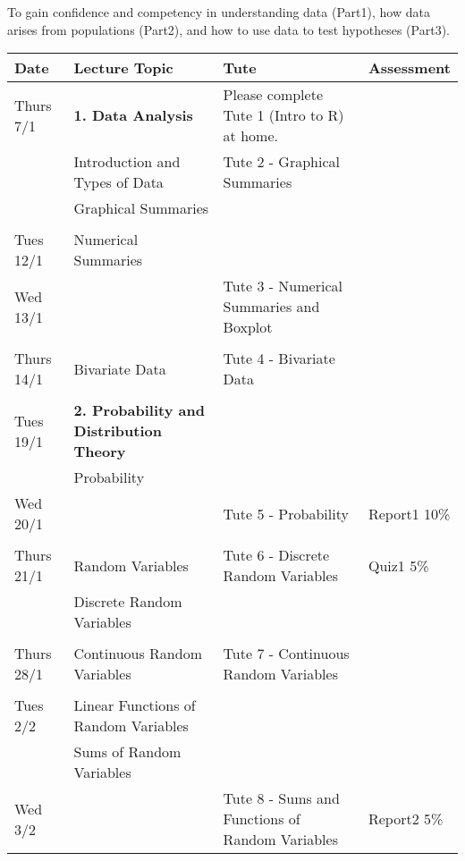 \documentclass[bigtut]{quiz}
\begin{document}

\begin{tutorial}

\vspace{.5cm}
{ } 

 To gain confidence and competency in understanding data (Part1), how data arises from populations (Part2), and how to use data to test hypotheses (Part3). 


\vspace{.5cm}
{ } 

{\small \begin{tabular}{|l|l|l|l|} \hline
{\bf Date} & {\bf Lecture Topic} & {\bf Tute} \hspace{4cm} & {\bf Assessment} \\ \hline
Thurs 7/1  & {\bf 1. Data Analysis} &   Please complete Tute 1 (Intro to R)  at home.  &  \\
 & Introduction and Types of Data &  Tute 2 - Graphical Summaries &  \\
 & Graphical Summaries &    & \\ 
& & & \\ \hline
Tues 12/1 & Numerical Summaries &  & \\
Wed 13/1 &  & Tute 3 - Numerical Summaries and Boxplot  & \\
& & & \\ \hline
Thurs 14/1 & Bivariate Data & Tute 4 - Bivariate Data & \\
& & & \\ \hline
Tues 19/1 & {\bf 2. Probability and Distribution Theory} &   &  \\
& Probability  & &  \\
Wed 20/1 &  & Tute 5 - Probability & Report1 10\%    \\
& & &  \\ \hline
Thurs 21/1 & Random Variables & Tute 6 - Discrete Random Variables & Quiz1 5\%  \\
 & Discrete Random Variables &  &  \\ 
& & & \\ \hline
Thurs 28/1  & Continuous Random Variables &  Tute 7 - Continuous Random Variables  & \\
& & & \\ \hline
Tues 2/2 & Linear Functions of Random Variables &  &  \\
 & Sums of Random Variables & & \\  
Wed 3/2 &  &Tute 8 - Sums  and Functions of Random Variables & Report2 5\% \\

\end{tabular}}
\end{tutorial}
\end{document}
